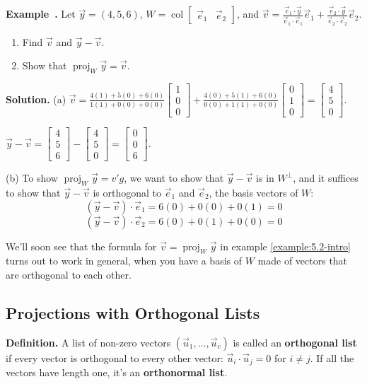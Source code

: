 \documentclass[11pt, letterpaper]{report}
\newenvironment{notes}{}{}
\newenvironment{book}{}{}
\newcounter{example}[section]
\newcommand{\example}{\refstepcounter{example}%
\par\noindent\textbf{Example~\theexample.} }
\newenvironment{definition}{\begin{bbox}\par\noindent\textbf{Definition. }}
  {\end{bbox}}
\newlength\oldfboxsep%
\newlength\myminiwidth%
\newenvironment{bbox}{%
  \setlength\oldfboxsep\fboxsep
  \setlength{\fboxsep}{.1in}%
  \setlength\myminiwidth\linewidth%
  \addtolength\myminiwidth{-0.2in}%
  \vspace{0.1in}%
  \begin{lrbox}{\bboxbox}\begin{minipage}{\myminiwidth}%
    }{%
    \end{minipage}\end{lrbox}%
  \noindent\fbox{\usebox{\bboxbox}}\vspace{0.1in}\setlength\fboxsep\oldfboxsep%
}
\DeclareMathOperator{\col}{col}
\DeclareMathOperator{\spn}{span}
\DeclareMathOperator{\proj}{proj}
\newcommand{\bbbvec}[3]{
  \begin{bmatrix} #1 \\ #2 \\ #3 \end{bmatrix}
}
\begin{document}
\begin{notes}
\newpage
\end{notes}

\example \label{example:5.2-intro} Let $\vec{y}=(4,5,6)$, $W = \col \begin{bmatrix}
\vec{e}_1 & \vec{e}_2
\end{bmatrix}$, and $\vec{v}=\frac{\vec{e}_1\cdot \vec{y}}{\vec{e}_1\cdot \vec{e}_1}\vec{e}_1 + \frac{\vec{e}_2\cdot \vec{y}}{\vec{e}_2\cdot \vec{e}_2}\vec{e}_2$.
\begin{enumerate}[label=(\alph*)]
\item Find $\vec{v}$ and $\vec{y}-\vec{v}$.
\item Show that $\proj_W\vec{y} = \vec{v}$.
\end{enumerate}

\begin{notes}
\vfill
\vfill
\end{notes}

\begin{book}
\textbf{Solution.} (a) $\vec{v}=\frac{4(1)+5(0)+6(0)}{1(1)+0(0)+0(0)}\bbbvec{1}{0}{0} + \frac{4(0)+5(1)+6(0)}{0(0)+1(1)+0(0)}\bbbvec{0}{1}{0} = \bbbvec{4}{5}{0}$.

$\vec{y}-\vec{v} =\bbbvec{4}{5}{6}-\bbbvec{4}{5}{0}= \bbbvec{0}{0}{6}$. 

(b) To show $\proj_W\vec{y} = v'g$, we want to show that $\vec{y} - \vec{v}$ is in $W^{\perp}$, and it suffices to show that $\vec{y}-\vec{v}$ is orthogonal to $\vec{e}_1$ and $\vec{e}_2$, the basis vectors of $W$:
\[(\vec{y}-\vec{v}) \cdot \vec{e}_1 = 6(0) + 0(0) + 0(1) = 0\]
\[(\vec{y}-\vec{v}) \cdot \vec{e}_2 = 6(0) + 0(1) + 0(0) = 0\]
\blacksquare
\end{book}

We'll soon see that the formula for $\vec{v}=\proj_W\vec{y}$ in example \ref{example:5.2-intro} turns out to work in general, when you have a basis of $W$ made of vectors that are orthogonal to each other. 

\subsection{Projections with Orthogonal Lists} \label{subsec:projections-with-orthogonal-lists}

\begin{definition}  
A list of non-zero vectors $( \vec{u}_1,\ldots,\vec{u}_c )$ is called an \textbf{orthogonal list} if every vector is orthogonal to every other vector: $\vec{u}_i\cdot \vec{u}_j=0$ for $i\ne j$. If all the vectors have length one, it's an \textbf{orthonormal list}.
\end{definition}
\end{document}
